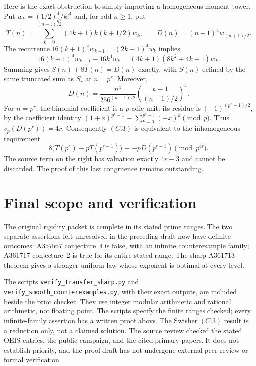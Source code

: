 \documentclass[11pt]{amsart}
\theoremstyle{definition}
\theoremstyle{remark}
\begin{document}
Here is the exact obstruction to simply importing a homogeneous moment
tower. Put $w_k=(1/2)_k^4/k!^4$ and, for odd $n\ge1$, put
\[
T(n)=\sum_{k=0}^{(n-1)/2}(4k+1)k(k+1/2)w_k,\qquad
D(n)=(n+1)^4w_{(n+1)/2}.
\]
The recurrence $16(k+1)^4w_{k+1}=(2k+1)^4w_k$ implies
\[
16(k+1)^4w_{k+1}-16k^4w_k
=(4k+1)(8k^2+4k+1)w_k.
\]
Summing gives $S(n)+8T(n)=D(n)$ exactly, with $S(n)$ defined by the
same truncated sum as $S_r$ at $n=p^r$. Moreover,
\[
D(n)=\frac{n^4}{256^{(n-1)/2}}
       \binom{n-1}{(n-1)/2}^{\!4}.
\]
For $n=p^r$, the binomial coefficient is a $p$-adic unit: its residue
is $(-1)^{(p^r-1)/2}$, by the coefficient identity
$(1+x)^{p^r-1}\equiv\sum_{k=0}^{p^r-1}(-x)^k\pmod p$.
Thus $v_p(D(p^r))=4r$.
Consequently $(C.3)$ is equivalent to the inhomogeneous requirement
\[
8\bigl(T(p^r)-pT(p^{r-1})\bigr)
\equiv-pD(p^{r-1})\pmod{p^{4r}}.
\]
The source term on the right has valuation exactly $4r-3$ and cannot
be discarded. The proof of this last congruence remains outstanding.

\section{Final scope and verification}\label{sec:status}
The original rigidity packet is complete in its stated prime ranges.
The two separate assertions left unresolved in the preceding draft now
have definite outcomes: A357567 conjecture~4 is false, with an infinite
counterexample family; A361717 conjecture~2 is true for its entire stated
range. The sharp A361713 theorem gives a stronger uniform law whose
exponent is optimal at every level.

The scripts \texttt{verify\_transfer\_sharp.py} and
\texttt{verify\_smooth\_counterexamples.py}, with their exact outputs,
are included beside the prior checker. They use integer modular arithmetic
and rational arithmetic, not floating point. The scripts specify the finite
ranges checked; every infinite-family assertion has a written proof above.
The Swisher $(C.3)$ result is a reduction only, not a claimed solution.
The source review checked the stated OEIS entries, the public campaign,
and the cited primary papers. It does not establish priority, and the
proof draft has not undergone external peer review or formal verification.
\end{document}
